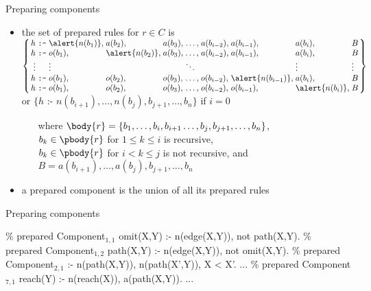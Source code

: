 \begin{frame}{Preparing components}

  \begin{itemize}
    \item the set of \alert{prepared rules} for \(r \in C\) is\\
      \(\arraycolsep=1.4pt
        \left\{\begin{array}{rcllllllll}
          h & \texttt{:-} & \alert{n(b_1)}, & a(b_2),   & a(b_3), & \dots, & a(b_{i-2}), & a(b_{i-1}), & a(b_i), & B\\
          h & \texttt{:-} & o(b_1), & \alert{n(b_2)},   & a(b_3), & \dots, & a(b_{i-2}), & a(b_{i-1}), & a(b_i), & B\\
          \vdots &        & \vdots  &         &         & \ddots &             &             & \vdots  & \vdots \\
          h & \texttt{:-} & o(b_1), & o(b_2), & o(b_3), & \dots, & o(b_{i-2}), & \alert{n(b_{i-1})}, & a(b_i), & B\\
          h & \texttt{:-} & o(b_1), & o(b_2), & o(b_3), & \dots, & o(b_{i-2}), & o(b_{i-1}), & \alert{n(b_i)}, & B
        \end{array}\right\}\)\\
      or \(\{h \texttt{ :- } n(b_{i+1}), \dots, n(b_j), b_{j+1}, \dots, b_n\}\) if \(i=0\)
      \begin{itemize}
        \item[where]
          \(\body{r} = \{ b_1, \dots, b_i, b_{i+1} \dots, b_j, b_{j+1}, \dots, b_n \}\), \\
          \(b_k\in\pbody{r}\) for \(1\leq k \leq i\) is recursive, \\
          \(b_k\in\pbody{r}\) for \(i< k \leq j\) is not recursive, and \\
          \(B = a(b_{i+1}), \dots, a(b_j), b_{j+1}, \dots, b_n\)
      \end{itemize}
    \item a \alert{prepared component} is the union of all its prepared rules
  \end{itemize}
\end{frame}
\begin{frame}[fragile]{Preparing components}

\begin{SemiVerbatim}{.9}
{\color{comment}\% prepared Component\(_{1,1}\)}
omit(X,Y) :- \alert{n(edge(X,Y))}, not path(X,Y).
{\color{comment}\% prepared Component\(_{1,2}\)}
path(X,Y) :- \alert{n(edge(X,Y))}, not omit(X,Y).
{\color{comment}\% prepared Component\(_{2,1}\)}
:- \alert{n(path(X,Y))}, \alert{n(path(X',Y))}, X < X'.
...
{\color{comment}\% prepared Component\(_{7,1}\)}
reach(Y) :- \alert{n(reach(X))}, \alert{a(path(X,Y))}.
...
\end{SemiVerbatim}
\end{frame}

